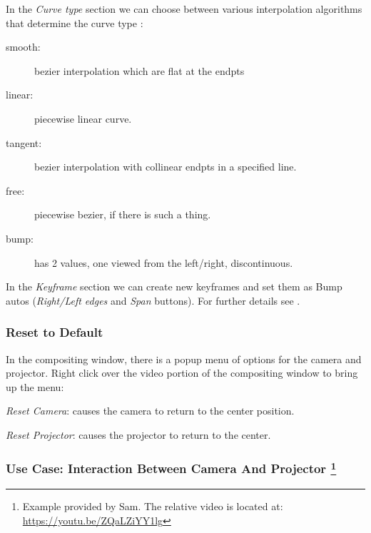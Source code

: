 In the \textit{Curve type} section we can choose between various interpolation algorithms that determine the curve type :

\begin{description}
	\item[smooth:] bezier interpolation which are flat at the endpts
	\item[linear:] piecewise linear curve.
	\item[tangent:] bezier interpolation with collinear endpts in a specified line.
	\item[free:] piecewise bezier, if there is such a thing.
	\item[bump:] has 2 values, one viewed from the left/right, discontinuous.
\end{description}

In the \textit{Keyframe} section we can create new keyframes and set them as Bump autos (\textit{Right/Left edges} and \textit{Span} buttons). For further details see .

\subsubsection*{Reset to Default}%
\label{ssub:reset_default}

In the compositing window, there is a popup menu of options for the camera and projector. Right click over the video portion of the compositing window to bring up the menu:

\textit{Reset Camera}: causes the camera to return to the center position.
    	
\textit{Reset Projector}: causes the projector to return to the center.

\subsubsection*{Use Case: Interaction Between Camera And Projector \protect\footnote{Example provided by Sam. The relative video is located at: \url{https://youtu.be/ZQaLZiYY1lg}}}%
\label{ssub:use_case_interaction_camera_projector}


